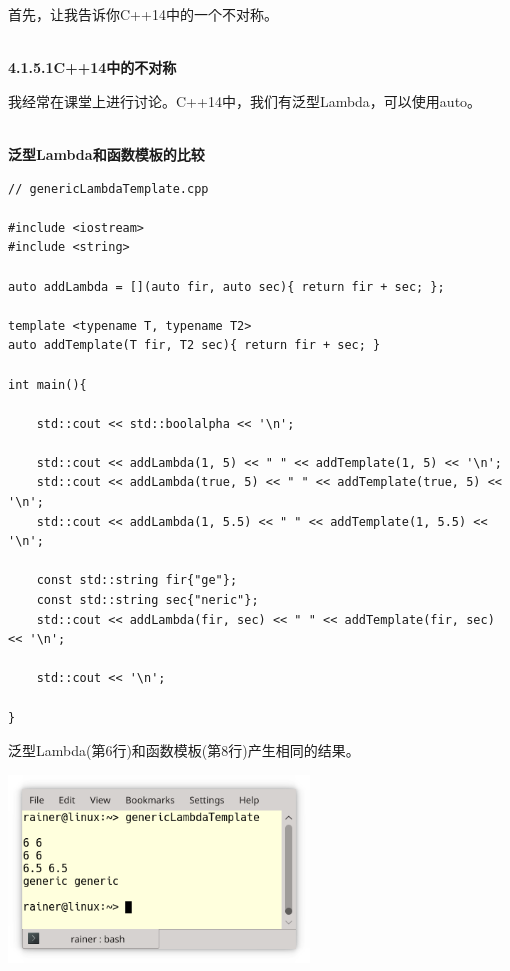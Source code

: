 
首先，让我告诉你C++14中的一个不对称。

\hspace*{\fill} \\ %
\noindent
\textbf{4.1.5.1\hspace{0.2cm}C++14中的不对称}

我经常在课堂上进行讨论。C++14中，我们有泛型Lambda，可以使用auto。

\hspace*{\fill} \\ %
\noindent
\textbf{泛型Lambda和函数模板的比较}
\begin{lstlisting}[style=styleCXX]
// genericLambdaTemplate.cpp

#include <iostream>
#include <string>

auto addLambda = [](auto fir, auto sec){ return fir + sec; };

template <typename T, typename T2>
auto addTemplate(T fir, T2 sec){ return fir + sec; }

int main(){

	std::cout << std::boolalpha << '\n';

	std::cout << addLambda(1, 5) << " " << addTemplate(1, 5) << '\n';
	std::cout << addLambda(true, 5) << " " << addTemplate(true, 5) << '\n';
	std::cout << addLambda(1, 5.5) << " " << addTemplate(1, 5.5) << '\n';

	const std::string fir{"ge"};
	const std::string sec{"neric"};
	std::cout << addLambda(fir, sec) << " " << addTemplate(fir, sec) << '\n';

	std::cout << '\n';

}
\end{lstlisting}

泛型Lambda(第6行)和函数模板(第8行)产生相同的结果。

\begin{center}
\includegraphics[width=0.6\textwidth]{content/3/chapter4/images/8.png}\\
\end{center}

